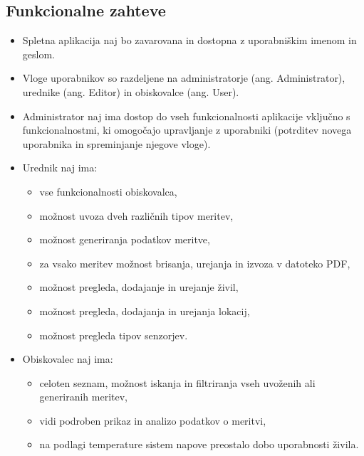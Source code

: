 \documentclass[a4paper, 12pt]{book}
\begin{document}
\subsection{Funkcionalne zahteve}

\begin{itemize}
\item Spletna aplikacija naj bo zavarovana in dostopna z uporabniškim imenom in geslom.

\item Vloge uporabnikov so razdeljene na administratorje (ang. Administrator), urednike (ang. Editor) in obiskovalce (ang. User).  

\item Administrator naj ima dostop do vseh funkcionalnosti aplikacije vključno s funkcionalnostmi, ki omogočajo upravljanje z uporabniki (potrditev novega uporabnika in spreminjanje njegove vloge).

\item Urednik naj ima:
	\begin{itemize}
		\item vse funkcionalnosti obiskovalca,
		
		\item možnost uvoza dveh različnih tipov meritev,

		\item možnost generiranja podatkov meritve,

		\item za vsako meritev možnost brisanja, urejanja in izvoza v datoteko PDF,

		\item možnost pregleda, dodajanje in urejanje živil,

		\item možnost pregleda, dodajanja in urejanja lokacij,

		\item možnost pregleda tipov senzorjev.
	\end{itemize}

\item Obiskovalec naj ima:
	\begin{itemize}
		\item celoten seznam, možnost iskanja in filtriranja vseh uvoženih ali generiranih meritev,
		
		\item vidi podroben prikaz in analizo podatkov o meritvi,
		
		\item na podlagi temperature sistem napove preostalo dobo uporabnosti živila.
	\end{itemize}
	

\end{itemize}
\end{document}
